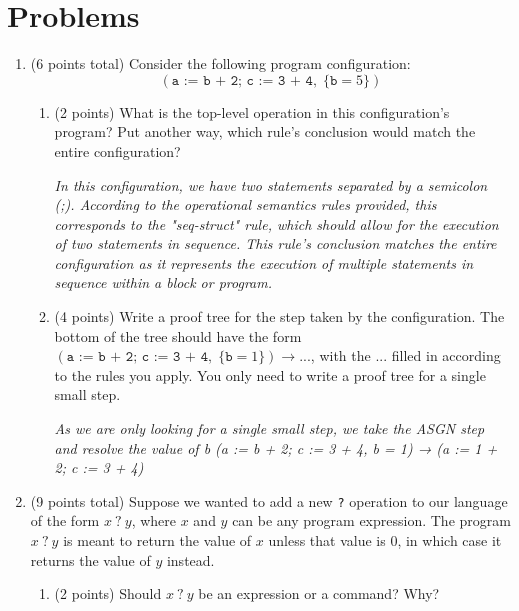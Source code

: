 \documentclass[11pt]{article}
\begin{document}
\section{Problems}

\begin{enumerate}
\item (6 points total) Consider the following program configuration: \[(\texttt{a := b + 2; c := 3 + 4},\; \{\texttt{b} = 5\})\]

\begin{enumerate}
\item (2 points) What is the top-level operation in this configuration's program? Put another way, which rule's conclusion would match the entire configuration?


\textit{In this configuration, we have two statements separated by a semicolon (;). According to the operational semantics rules provided, this corresponds to the "seq-struct" rule, which should allow for the execution of two statements in sequence. This rule's conclusion matches the entire configuration as it represents the execution of multiple statements in sequence within a block or program.
}

\vspace{.5in}


\item (4 points) Write a proof tree for the step taken by the configuration. The bottom of the tree should have the form $(\texttt{a := b + 2; c := 3 + 4},\; \{\texttt{b} = 1\}) \rightarrow ...$, with the $...$ filled in according to the rules you apply. You only need to write a proof tree for a single small step.


\textit{
As we are only looking for a single small step, we take the ASGN step and resolve the value of b
(a := b + 2; c := 3 + 4, {b = 1}) → (a := 1 + 2; c := 3 + 4)
}

\end{enumerate}
\newpage

\item (9 points total) Suppose we wanted to add a new \texttt{?} operation to our language of the form $x\ \texttt{?}\ y$, where $x$ and $y$ can be any program expression. The program $x\ \texttt{?}\ y$ is meant to return the value of $x$ unless that value is 0, in which case it returns the value of $y$ instead.

\begin{enumerate}
\item (2 points) Should $x\ \texttt{?}\ y$ be an expression or a command? Why?


\end{enumerate}
\end{enumerate}
\end{document}
